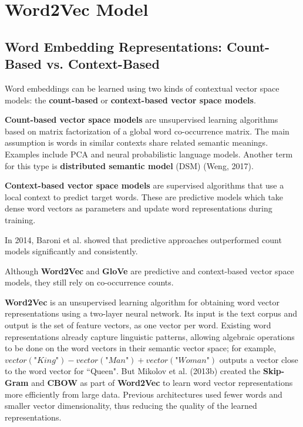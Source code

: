 \section{Word2Vec Model} \label{sec:Word2Vec}

\subsection{Word Embedding Representations: Count-Based vs. Context-Based} \label{sec:CountVsContextModels}
 
Word embeddings can be learned using two kinds of contextual vector space models: the \textbf{count-based} or \textbf{context-based vector space models}. 

\textbf{Count-based vector space models} are unsupervised learning algorithms based on matrix factorization of a global word co-occurrence matrix. The main assumption is words in similar contexts share related semantic meanings. Examples include PCA and neural probabilistic language models. Another term for this type is \textbf{distributed semantic model} (DSM) (Weng, 2017). 

\textbf{Context-based vector space models} are supervised algorithms that use a local context to predict target words. These are predictive models which take dense word vectors as parameters and update word representations during training.

In 2014, Baroni et al. showed that predictive approaches outperformed count models significantly and consistently. 

Although \textbf{Word2Vec} and \textbf{GloVe} are predictive and context-based vector space models, they still rely on co-occurrence counts. 

\textbf{Word2Vec} is an unsupervised learning algorithm for obtaining word vector representations using a two-layer neural network. Its input is the text corpus and output is the set of feature vectors, as one vector per word. Existing word representations already capture linguistic patterns, allowing algebraic operations to be done on the word vectors in their semantic vector space; for example, $vector(\textit{"King"}) - vector(\textit{"Man"}) + vector(\textit{"Woman"})$ outputs a vector close to the word vector for ``Queen". But Mikolov et al. (2013b) created the \textbf{Skip-Gram} and \textbf{CBOW} as part of \textbf{Word2Vec} to learn word vector representations more efficiently from large data. Previous architectures used fewer words and smaller vector dimensionality, thus reducing the quality of the learned representations. 

